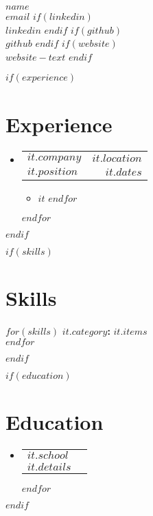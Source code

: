 \documentclass[letterpaper,11pt]{article}
\makeatletter
\newcommand{\resumeItem}[1]{\item\small{#1 \vspace{-2pt}}}
\newcommand{\resumeSubheading}[4]{
  \vspace{6pt}\item
    \begin{tabular*}{0.97\textwidth}[t]{l@{\extracolsep{\fill}}r}
      \textbf{#1} & #2 \\
      \textit{\small#3} & \textit{\small #4} \\
    \end{tabular*}\vspace{-7pt}
}
\newcommand{\resumeEducationHeading}[2]{
  \vspace{6pt}\item
    \begin{tabular*}{0.97\textwidth}[t]{l@{\extracolsep{\fill}}r}
      \textbf{#1} \\
      \textit{\small#2} \\
    \end{tabular*}\vspace{-5pt}
}
\newcommand{\resumeSubHeadingListStart}{\begin{itemize}[leftmargin=0.15in, label={}]}
\newcommand{\resumeSubHeadingListEnd}{\end{itemize}}
\newcommand{\resumeItemListStart}{\begin{itemize}}
\newcommand{\resumeItemListEnd}{\end{itemize}\vspace{-5pt}}
\makeatother
\begin{document}
\begin{center}
    \textbf{\Huge \scshape $name$} \\ \vspace{3pt}
    \small
    \faAt \hspace{.5pt} \href{mailto:$email$}{$email$}
    $if(linkedin)$
    $$ $$ \faLinkedinSquare \hspace{.5pt} \href{https://www.linkedin.com/in/$linkedin$}{$linkedin$}
    $endif$
    $if(github)$
    $$ $$ \faGithub \hspace{.5pt} \href{https://github.com/$github$}{$github$}
    $endif$
    $if(website)$
    $$ $$ \faGlobe \hspace{.5pt} \href{$website$}{$website-text$}
    $endif$
\end{center}

$if(experience)$
\section{Experience}
\vspace{3pt}
\resumeSubHeadingListStart
$for(experience)$
\resumeSubheading
  {$it.company$}{$it.location$}
  {$it.position$}{$it.dates$}
  \resumeItemListStart
    $for(it.highlights)$
    \resumeItem{$it$}
    $endfor$
  \resumeItemListEnd
$endfor$
\resumeSubHeadingListEnd
$endif$

$if(skills)$
\section{Skills}
\vspace{6pt}
\resumeSubHeadingListStart
\small{\item{
    $for(skills)$
    \textbf{$it.category$:} {$it.items$} \\ \vspace{3pt}
    $endfor$
}}
\resumeSubHeadingListEnd
$endif$

$if(education)$
\section{Education}
\vspace{3pt}
\resumeSubHeadingListStart
$for(education)$
\resumeEducationHeading
  {$it.school$}
  {$it.details$}
$endfor$
\resumeSubHeadingListEnd
$endif$
\end{document}
